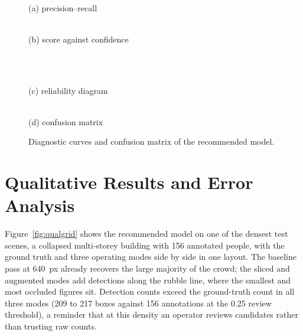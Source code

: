 \begin{figure}[H]
  \centering
  \begin{minipage}{0.49\linewidth}\centering
    \\[2pt]
    {\small (a) precision--recall}
  \end{minipage}\hfill
  \begin{minipage}{0.49\linewidth}\centering
    \\[2pt]
    {\small (b) score against confidence}
  \end{minipage}\\[6pt]
  \begin{minipage}{0.49\linewidth}\centering
    \\[2pt]
    {\small (c) reliability diagram}
  \end{minipage}\hfill
  \begin{minipage}{0.49\linewidth}\centering
    \\[2pt]
    {\small (d) confusion matrix}
  \end{minipage}
  \caption{Diagnostic curves and confusion matrix of the recommended model.}
  \label{fig:diag}
\end{figure}

\section{Qualitative Results and Error Analysis}
\label{sec:qual}
Figure~\ref{fig:qualgrid} shows the recommended model on one of the densest
test scenes, a collapsed multi-storey building with 156 annotated people,
with the ground truth and three operating modes side by side in one layout.
The baseline pass at 640~px already recovers the large majority of the crowd;
the sliced and augmented modes add detections along the rubble line, where
the smallest and most occluded figures sit. Detection counts exceed the
ground-truth count in all three modes (209 to 217 boxes against 156
annotations at the 0.25 review threshold), a reminder that at this density an
operator reviews candidates rather than trusting raw counts.

